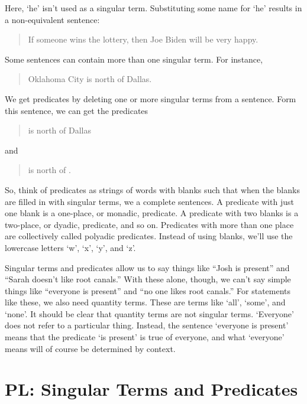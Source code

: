 \documentclass[../logic-text.tex]{subfiles}
\begin{document}
Here, \enquote*{he} isn't used as a singular term. Substituting some name for \enquote*{he} results in a non-equivalent sentence:

\begin{quote}
If someone wins the lottery, then Joe Biden will be very happy.
\end{quote}

Some sentences can contain more than one singular term. For instance,

\begin{quote}
Oklahoma City is north of Dallas.
\end{quote}

We get predicates by deleting one or more singular terms from a sentence. Form this sentence, we can get the predicates

\begin{quote}
\underline{\phantom{XXXXX}} is north of Dallas
\end{quote}

and

\begin{quote}
\underline{\phantom{XXXXX}} is north of \underline{\phantom{XXXXX}}.
\end{quote}

So, think of predicates as strings of words with blanks such that when the blanks are filled in with singular terms, we a complete sentences.
A predicate with just one blank is a one-place, or monadic, predicate.
A predicate with two blanks is a two-place, or dyadic, predicate, and so on.
Predicates with more than one place are collectively called polyadic predicates.
Instead of using blanks, we'll use the lowercase letters \enquote*{w}, \enquote*{x},  \enquote*{y},  and \enquote*{z}.


Singular terms and predicates allow us to say things like \enquote{Josh is present} and \enquote{Sarah doesn't like root canals.}
With these alone, though, we can't say simple things like \enquote{everyone is present} and \enquote{no one likes root canals.}
For statements like these, we also need quantity terms.
These are terms like \enquote*{all}, \enquote*{some}, and \enquote*{none}.
It should be clear that quantity terms are not singular terms.
\enquote*{Everyone} does not refer to a particular thing.
Instead, the sentence \enquote*{everyone is present} means that the predicate \enquote*{is present} is true of everyone, and what \enquote*{everyone} means will of course be determined by context.


\section{PL: Singular Terms and Predicates}
\label{sec:pl-s-terms-pred}
\end{document}
